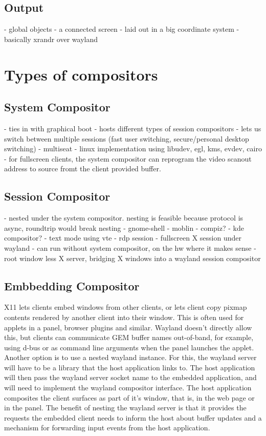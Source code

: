\documentclass{article}
\begin{document}
\subsection{Output}

 - global objects
 - a connected screen
 - laid out in a big coordinate system
 - basically xrandr over wayland

\section{Types of compositors}

\subsection{System Compositor}

 - ties in with graphical boot
 - hosts different types of session compositors
 - lets us switch between multiple sessions (fast user switching,
   secure/personal desktop switching)
 - multiseat
 - linux implementation using libudev, egl, kms, evdev, cairo
 - for fullscreen clients, the system compositor can reprogram the
   video scanout address to source fromt the client provided buffer.

\subsection{Session Compositor}

 - nested under the system compositor.  nesting is feasible because
   protocol is async, roundtrip would break nesting
 - gnome-shell
 - moblin
 - compiz?
 - kde compositor?
 - text mode using vte
 - rdp session
 - fullscreen X session under wayland
 - can run without system compositor, on the hw where it makes
   sense
 - root window less X server, bridging X windows into a wayland
   session compositor

\subsection{Embbedding Compositor}

X11 lets clients embed windows from other clients, or lets client copy
pixmap contents rendered by another client into their window.  This is
often used for applets in a panel, browser plugins and similar.
Wayland doesn't directly allow this, but clients can communicate GEM
buffer names out-of-band, for example, using d-bus or as command line
arguments when the panel launches the applet.  Another option is to
use a nested wayland instance.  For this, the wayland server will have
to be a library that the host application links to.  The host
application will then pass the wayland server socket name to the
embedded application, and will need to implement the wayland
compositor interface.  The host application composites the client
surfaces as part of it's window, that is, in the web page or in the
panel.  The benefit of nesting the wayland server is that it provides
the requests the embedded client needs to inform the host about buffer
updates and a mechanism for forwarding input events from the host
application.
\end{document}
